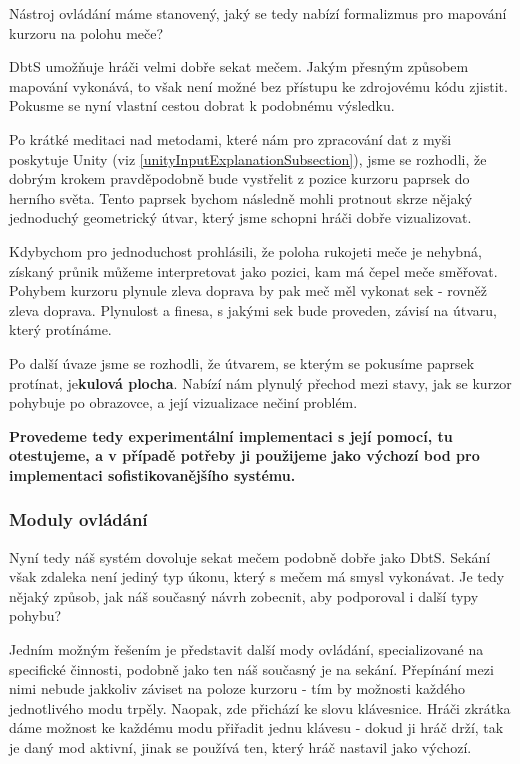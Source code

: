 Nástroj ovládání máme stanovený, jaký se tedy nabízí formalizmus pro mapování kurzoru na polohu meče?

\acl{DbtS} umožňuje hráči velmi dobře sekat mečem. Jakým přesným způsobem mapování vykonává, to však není možné bez přístupu ke zdrojovému kódu zjistit. Pokusme se nyní vlastní cestou dobrat k podobnému výsledku.

Po krátké meditaci nad metodami, které nám pro zpracování dat z myši poskytuje Unity (viz \ref{unityInputExplanationSubsection}), jsme se rozhodli, že dobrým krokem pravděpodobně bude vystřelit z pozice kurzoru paprsek do herního světa. Tento paprsek bychom následně mohli protnout skrze nějaký jednoduchý geometrický útvar, který jsme schopni hráči dobře vizualizovat. 

Kdybychom pro jednoduchost prohlásili, že poloha rukojeti meče je nehybná, získaný průnik můžeme interpretovat jako pozici, kam má čepel meče směřovat. Pohybem kurzoru plynule zleva doprava by pak meč měl vykonat sek - rovněž zleva doprava. Plynulost a finesa, s jakými sek bude proveden, závisí na útvaru, který protínáme. 

Po další úvaze jsme se rozhodli, že útvarem, se kterým se pokusíme paprsek protínat, je\textbf{kulová plocha}. Nabízí nám plynulý přechod mezi stavy, jak se kurzor pohybuje po obrazovce, a její vizualizace nečiní problém. 

\textbf{Provedeme tedy experimentální implementaci s její pomocí, tu otestujeme, a v případě potřeby ji použijeme jako výchozí bod pro implementaci sofistikovanějšího systému.}

\subsubsection*{Moduly ovládání}

Nyní tedy náš systém dovoluje sekat mečem podobně dobře jako \acl{DbtS}. Sekání však zdaleka není jediný typ úkonu, který s mečem má smysl vykonávat. Je tedy nějaký způsob, jak náš současný návrh zobecnit, aby podporoval i další typy pohybu?

Jedním možným řešením je představit další mody ovládání, specializované na specifické činnosti, podobně jako ten náš současný je na sekání. Přepínání mezi nimi nebude jakkoliv záviset na poloze kurzoru - tím by možnosti každého jednotlivého modu trpěly. Naopak, zde přichází ke slovu klávesnice. Hráči zkrátka dáme možnost ke každému modu přiřadit jednu klávesu - dokud ji hráč drží, tak je daný mod aktivní, jinak se používá ten, který hráč nastavil jako výchozí.

